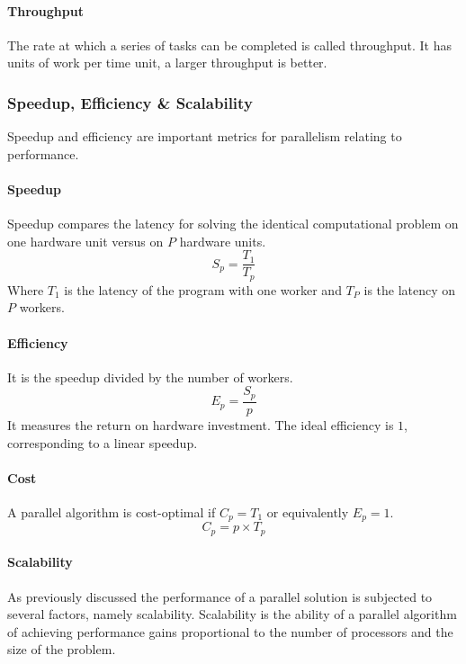 \paragraph{Throughput}
The rate at which a series of tasks can be completed is called throughput.
It has units of work per time unit, a larger throughput is better.

\subsubsection{Speedup, Efficiency \& Scalability}
Speedup and efficiency are important metrics for parallelism relating to performance.

\paragraph{Speedup}
Speedup compares the latency for solving the identical computational problem on one hardware unit versus on $P$ hardware units.
\begin{equation}\label{eq:speedup}
    S_p = \frac{T_1}{T_p}
\end{equation}
Where $T_1$ is the latency of the program with one worker and $T_P$ is the latency on $P$ workers.

\paragraph{Efficiency}
It is the speedup divided by the number of workers.
\begin{equation}\label{eq:efficiency}
    E_p = \frac{S_p}{p}
\end{equation}
It measures the return on hardware investment.
The ideal efficiency is $1$, corresponding to a linear speedup.

\paragraph{Cost}
A parallel algorithm is cost-optimal if $C_p = T_1$ or equivalently $E_p = 1$.
\begin{equation}\label{eq:cost}
    C_p = p \times T_p
\end{equation}

\paragraph{Scalability}
As previously discussed the performance of a parallel solution is subjected to several factors, namely scalability.
Scalability is the ability of a parallel algorithm of achieving performance gains proportional to the number of processors and the size of the problem.


